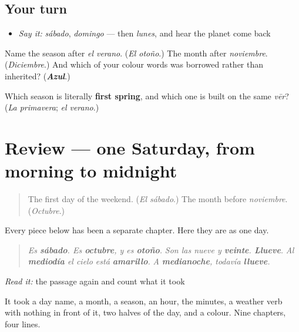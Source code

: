 \subsection*{Your turn}
\begin{itemize}
\raggedright
  \item \emph{Say it:} \emph{sábado}, \emph{domingo} — then \emph{lunes}, and hear the planet come back
\end{itemize}

\begin{tcolorbox}[breakable,colback=teal!4,colframe=teal!35!black,title={Before you move on}]
Name the season after \emph{el verano}. (\emph{El otoño}.) The month after \emph{noviembre}. (\emph{Diciembre}.) And which of your colour words was borrowed rather than inherited? (\emph{\textbf{Azul}}.)

Which season is literally \textbf{first spring}, and which one is built on the same \emph{vēr}? (\emph{La primavera}; \emph{el verano}.)
\end{tcolorbox}
\section[(review)]{Review — one Saturday, from morning to midnight}

\label{lesson:ES-C40-repaso-un-sabado-de-octubre}



\begin{quote}
The first day of the weekend. (\emph{El sábado}.) The month before \emph{noviembre}. (\emph{Octubre}.)
\end{quote}

\begin{grammarlens}[title={What you've built}]
Every piece below has been a separate chapter. Here they are as one day.

\begin{quote}
\emph{Es \textbf{sábado}. Es \textbf{octubre}, y es \textbf{otoño}.} \emph{Son las nueve y \textbf{veinte}. \textbf{Llueve}.} \emph{Al \textbf{mediodía} el cielo está \textbf{amarillo}.} \emph{A \textbf{medianoche}, todavía \textbf{llueve}.}
\end{quote}

\emph{Read it:} the passage again and count what it took

It took a day name, a month, a season, an hour, the minutes, a weather verb with nothing in front of it, two halves of the day, and a colour. Nine chapters, four lines.
\end{grammarlens}

